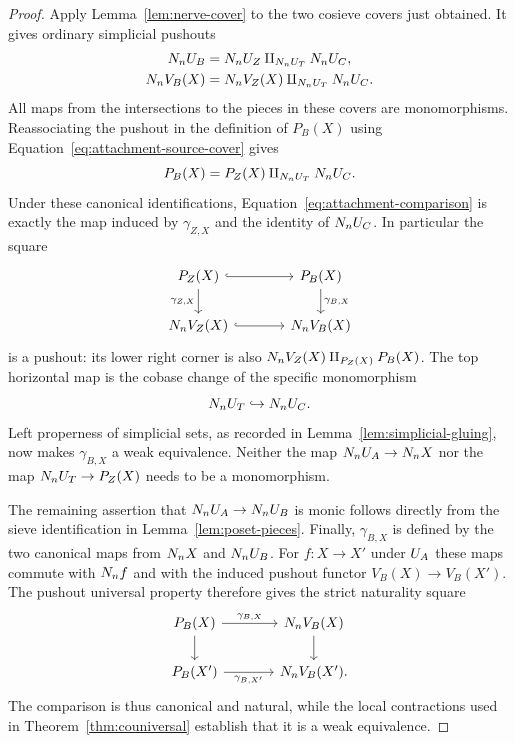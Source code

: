 \begin{proof}
Apply Lemma~\ref{lem:nerve-cover} to the two cosieve covers just
obtained.  It gives ordinary simplicial pushouts
\begin{align}
 N_nU_{B}
   &=N_nU_{Z}\amalg_{N_nU_{T}}N_nU_{C},
   \label{eq:attachment-source-cover}\\
 N_n V_B(X)
   &=N_n V_Z(X)\amalg_{N_nU_{T}}N_nU_{C}.
   \label{eq:attachment-target-cover}
\end{align}
All maps from the intersections to the pieces in these covers are
monomorphisms.  Reassociating the pushout in the definition of
$P_B(X)$ using Equation~\eqref{eq:attachment-source-cover} gives
\[
 P_B(X)=P_Z(X)\amalg_{N_nU_{T}}N_nU_{C}.
\]
Under these canonical identifications, Equation~\eqref{eq:attachment-comparison}
is exactly the map induced by $\gamma_{Z,X}$ and the identity of
$N_nU_{C}$.  In particular the square
\[
 \begin{tikzcd}[column sep=large]
 P_Z(X) \arrow[r,hook] \arrow[d,"\gamma_{Z,X}"'] &
 P_B(X) \arrow[d,"\gamma_{B,X}"]\\
 \Street V_Z(X) \arrow[r,hook] & \Street V_B(X)
 \end{tikzcd}
\]
is a pushout: its lower right corner is also
$N_n V_Z(X)\amalg_{P_Z(X)}P_B(X)$.
The top horizontal map is the cobase change of the specific
monomorphism
\begin{equation}
 N_nU_{T}\hookrightarrow N_nU_{C}.
 \label{eq:comparison-monomorphism}
\end{equation}
Left properness of simplicial sets, as recorded in
Lemma~\ref{lem:simplicial-gluing}, now makes $\gamma_{B,X}$ a weak
equivalence.  Neither the map $N_nU_{A}\to N_n X$ nor the
map $N_nU_{T}\to P_Z(X)$ needs to be a monomorphism.

The remaining assertion that $N_nU_{A}\to N_nU_{B}$ is
monic follows directly from the sieve identification in
Lemma~\ref{lem:poset-pieces}.  Finally, $\gamma_{B,X}$ is defined
by the two canonical maps from $N_n X$ and $N_nU_{B}$.
For $f:X\to X'$ under $U_{A}$ these maps commute with $N_n f$
and with the induced pushout functor $V_B(X)\to V_B(X')$.
The pushout universal property therefore gives the strict naturality
square
\begin{equation}
 \begin{tikzcd}[column sep=large]
 P_B(X) \arrow[r,"\gamma_{B,X}"] \arrow[d] &
 \Street V_B(X) \arrow[d]\\
 P_B(X') \arrow[r,"\gamma_{B,X'}"'] & \Street V_B(X').
 \end{tikzcd}
 \label{eq:attachment-naturality}
\end{equation}
The comparison is thus canonical and natural, while the local
contractions used in Theorem~\ref{thm:couniversal} establish that it
is a weak equivalence.
\end{proof}

